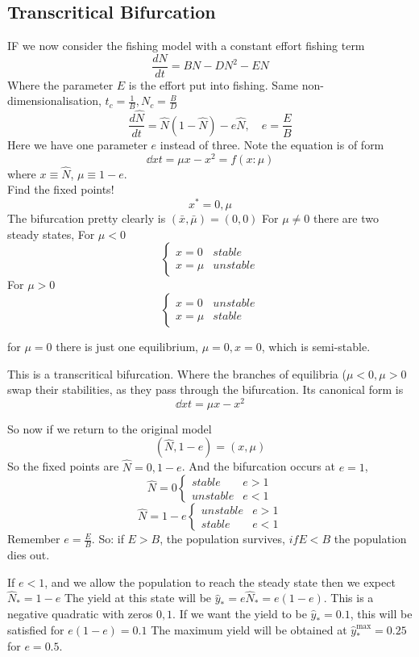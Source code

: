 \documentclass{X:/Documents/Coding/Latex/myassignment}
\begin{document}
\subsection{Transcritical Bifurcation}
IF we now consider the fishing model with a constant effort fishing term
\[\frac{dN}{dt} = BN - DN^2 - EN\]
Where the parameter $E$ is the effort put into fishing.
Same non-dimensionalisation, $t_c = \frac1B, N_c =\frac{B}{D}$
\[\frac{d\hat{N}}{dt} = \hat{N} (1-\hat{N}) - e\hat{N}, \quad e=\frac{E}{B}\]
Here we have one parameter $e$ instead of three.
Note the equation is of form
\[\dd xt = \mu x - x^2 = f(x:\mu)\]
where $x\equiv \hat{N}$, $\mu\equiv 1-e$.\\
Find the fixed points!
\[x^* = 0, \mu\]
The bifurcation pretty clearly is $(\bar{x},\bar{\mu}) = (0,0)$
For $\mu \neq 0$ there are two steady states, For $\mu < 0$
\[\begin{cases}x=0 &stable\\ x=\mu &unstable\end{cases}\]
For $\mu > 0$
\[\begin{cases}x=0 &unstable\\ x=\mu &stable\end{cases}\]

for $\mu=0$ there is just one equilibrium, $\mu =0, x=0$, which is semi-stable.

This is a transcritical bifurcation. Where the branches of equilibria ($\mu <0,\mu >0$ swap their stabilities, as they pass through the bifurcation. Its canonical form is
\[\dd xt = \mu x - x^2\]


So now if we return to the original model
\[(\hat{N},1-e) = (x,\mu)\]
So the fixed points are $\hat{N} = 0, 1-e$. And the bifurcation occurs at $e=1$, 
\[\hat{N} = 0 \begin{cases} stable & e>1 \\ unstable & e<1\end{cases}\]
\[\hat{N} = 1-e \begin{cases}unstable & e>1\\ stable & e<1\end{cases}\]
Remember $e = \frac{E}{B}$. So: if $E > B$, the population survives, $if E <B$ the population dies out.

If $e <1$, and we allow the population to reach the steady state then we expect $\hat{N}_* = 1-e$
The yield at this state will be $\hat{y}_* = e\hat{N}_* = e(1-e)$. This is a negative quadratic with zeros $0,1$. If we want the yield to be $\hat{y}_* = 0.1$, this will be satisfied for $e(1-e) = 0.1$
The maximum yield will be obtained at $\hat{y}_*^{\max} = 0.25$ for $e=0.5$.
\end{document}
